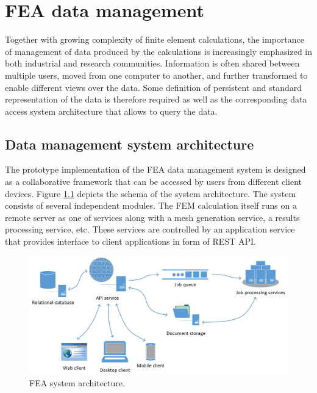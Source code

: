 \chapter{FEA data management}

Together with growing complexity of finite element calculations, the importance of management of data produced by the calculations is increasingly emphasized in both industrial and research communities. Information is often shared between multiple users, moved from one computer to another, and further transformed to enable different views over the data. Some definition of persistent and standard representation of the data is therefore required as well as the corresponding data access system architecture that allows to query the data.

\section{Data management system architecture}

The prototype implementation of the FEA data management system is designed as a collaborative framework that can be accessed by users from different client devices. Figure \ref{fig:FEA-architecture} depicts the schema of the system architecture. The system consists of several independent modules. The FEM calculation itself runs on a remote server as one of services along with a mesh generation service, a results processing service, etc. These services are controlled by an application service that provides interface to client applications in form of REST API.

\begin{figure}[H]
    \centering
    \includegraphics[width=\textwidth]{figures/chapter-data-management/FEA-architecture}
    \decoRule
    \caption{FEA system architecture.}
    \label{fig:FEA-architecture}
\end{figure}

